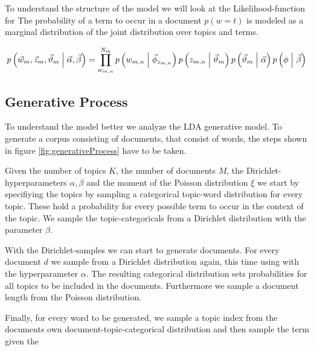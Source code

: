 \documentclass[12 pt,twopage]{article}
\begin{document}
To understand the structure of the model we will look at the Likelihood-function for
The probability of a term to occur in a document \(p \left( w=t \right)\) is modeled as a marginal distribution of the joint distribution over topics and terms.
\onecolumn

\begin{equation*}
 p\left( \vec{w}_{m}, \vec{z}_{m}, \vec{\vartheta}_{m} \mathrel{}\middle|\mathrel{} \vec{\alpha}, \vec{\beta} \right) = \prod\limits_{w_{m,n}}^{N_m} p \left(w_{m,n} \mathrel{}\middle|\mathrel{} \vec\phi_{z_{m,n}} \right) p \left(z_{m,n} \mathrel{}\middle|\mathrel{} \vec\vartheta_{m} \right) p\left( \vec\vartheta_m \mathrel{}\middle|\mathrel{} \vec\alpha \right) p \left( \phi \mathrel{}\middle|\mathrel{} \vec\beta \right)
\end{equation*}

\subsection{Generative Process}
To understand the model better we analyze the LDA generative model. To generate a corpus consisting of documents, that consist of words, the steps shown in figure \ref{fig:generativeProcess} have to be taken.

Given the number of topics \(K\), the number of documents \(M\), the Dirichlet-hyperparameters \(\alpha,\beta\) and the moment of the Poisson distribution \( \xi \) we start by specifiying the topics by sampling a categorical topic-word distribution for every topic. These hold a probability for every possible term to occur in the context of the topic. We sample the topic-categoricals from a Dirichlet distribution with the parameter \(\beta\).

With the Dirichlet-samples we can start to generate documents. For every document \( d \) we sample from a Dirichlet distribution again, this time using with the hyperparameter \( \alpha \). The resulting categorical distribution sets probabilities for all topics to be included in the documents. Furthermore we sample a document length from the Poisson distribution.

Finally, for every word to be generated, we sample a topic index from the documents own document-topic-categorical distribution and then sample the term given the
\end{document}
